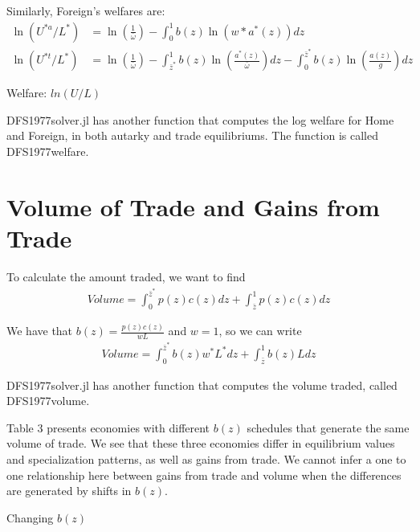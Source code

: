 \documentclass[11pt]{article}
\begin{document}
Similarly, Foreign's welfares are:
\begin{align*}
    \ln (U^{* a} / L^*) &=\ln \left(\frac{1}{\bar{\omega}}\right)-\int_{0}^{1} b(z) \ln (w* a^*(z)) dz \\
    \ln (U^{* t} / L^*) &= \ln \left(\frac{1}{\bar{\omega}}\right) -\int_{\bar{z}^*}^{1} b(z) \ln \left(\frac{a^*(z)}{\bar{\omega}}\right) d z-\int_{0}^{\bar{z}^*} b(z) \ln \left(\frac{a(z) }{g}\right) d z
\end{align*}

\begin{table}[H]
    \centering
    \caption{Welfare: $ln(U/L)$}
    
\end{table}

DFS1977solver.jl has another function that computes the log welfare for Home and Foreign, in both autarky and trade equilibriums. The function is called DFS1977welfare. 

\section{Volume of Trade and Gains from Trade}
To calculate the amount traded, we want to find 
\begin{align*}
    Volume =\int_{0}^{\bar{z}^{*}} p(z) c(z) d z + \int_{\bar{z}}^{1} p(z) c(z) d z
\end{align*}

We have that $b(z) = \frac{p(z)c(z)}{wL}$ and $w = 1$, so we can write 
\begin{align*}
    Volume = \int_{0}^{\bar{z}^{*}} b(z) w^* L^{*} d z+\int_{\bar{z}}^{1} b(z) L d z
\end{align*}

DFS1977solver.jl has another function that computes the volume traded, called DFS1977volume. 

Table 3 presents economies with different $b(z)$ schedules that generate the same volume of trade. We see that these three economies differ in equilibrium values and specialization patterns, as well as gains from trade. We cannot infer a one to one relationship here between gains from trade and volume when the differences are generated by shifts in $b(z)$. 

\begin{table}[H]
    \centering
    \caption{Changing $b(z)$}
    
\end{table}
\end{document}
